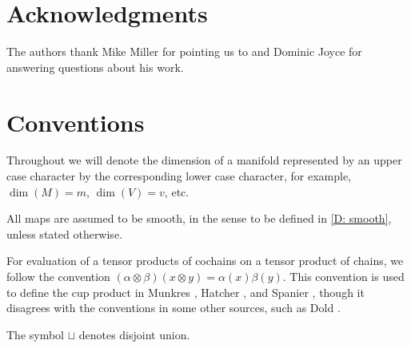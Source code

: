 \section*{Acknowledgments}

The authors thank Mike Miller for pointing us to \cite{Lipy14} and Dominic Joyce for answering questions about his work.

\section*{Conventions}

Throughout we will denote the dimension of a manifold represented by an upper case character by the corresponding lower case character, for example, $\dim(M) = m$, $\dim(V) = v$, etc.

All maps are assumed to be smooth, in the sense to be defined in \cref{D: smooth}, unless stated otherwise. 

For evaluation of a tensor products of cochains on a tensor product of chains, we follow the convention  $(\alpha \otimes \beta)(x\otimes y) = \alpha(x)\beta(y)$.
This convention is used to define the cup product in Munkres \cite[Section 60]{Mun84}, Hatcher \cite[Section 3.2]{Hatc02}, and Spanier \cite[Section 5.6]{Span81}, though it disagrees with the conventions in some other sources, such as Dold \cite[Section VII.7]{Dol72}.

The symbol $\sqcup$ denotes disjoint union.